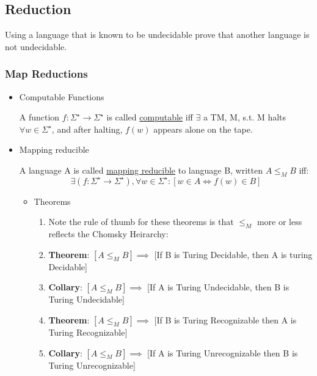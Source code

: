 \documentclass[11pt]{article}
\begin{document}
\subsection{Reduction}
\label{sec-5.8}

   Using a language that is known to be undecidable prove that another
   language is not undecidable.

\subsubsection{Map Reductions}
\label{sec-5.8.1}

\begin{itemize}

\item Computable Functions\\
\label{sec-5.8.1.1}

     A function $f:\Sigma^{\star} \rightarrow \Sigma^{\star}$ is
     called \underline{computable} iff $\exists$ a TM, M, s.t. M halts $\forall
     w\in \Sigma^{\star}$, and after halting, $f(w)$ appears alone on
     the tape.

\item Mapping reducible\\
\label{sec-5.8.1.2}

     A language A is called \underline{mapping reducible} to language B, written
     $A \leq_M B$ iff: 
     \begin{equation}
     \exists (f: \Sigma^{\star} \rightarrow
     \Sigma^{\star})
     , \forall w \in \Sigma^{\star} : [w \in A \iff
     f(w) \in B ]
     \end{equation}
\begin{itemize}

\item Theorems\\
\label{sec-5.8.1.2.1}

\begin{enumerate}
\item Note the rule of thumb for these theorems is that $\leq_M$
         more or less reflects the Chomsky Heirarchy:
\item \textbf{Theorem}: $[A\leq_M B] \implies$ [If B is Turing Decidable, then A is
         turing Decidable]
\item \textbf{Collary}: $[A\leq_M B] \implies$ [If A is Turing Undecidable, then B
         is Turing Undecidable]
\item \textbf{Theorem}: $[A\leq_M B] \implies$ [If B is Turing
         Recognizable then A is Turing Recognizable]
\item \textbf{Collary}: $[A\leq_M B] \implies$ [If A is Turing
         Unrecognizable then B is Turing Unrecognizable]
\end{enumerate}
\end{itemize} %
\end{itemize} %
\end{document}
